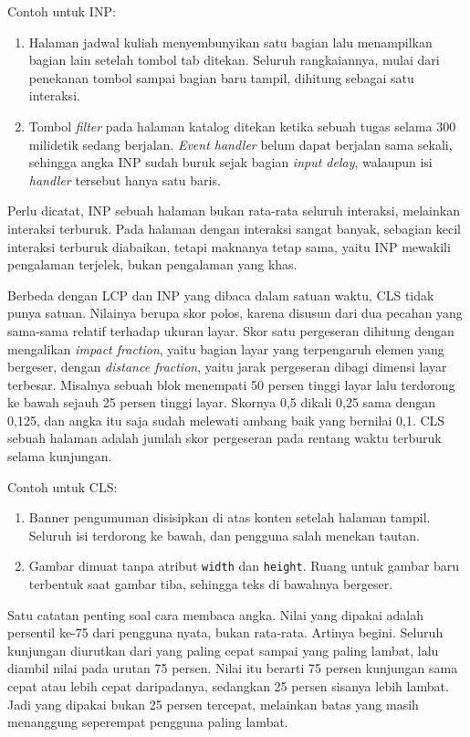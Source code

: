 Contoh untuk INP:

\begin{enumerate}
  \item Halaman jadwal kuliah menyembunyikan satu bagian lalu menampilkan
        bagian lain setelah tombol tab ditekan. Seluruh rangkaiannya, mulai
        dari penekanan tombol sampai bagian baru tampil, dihitung sebagai satu
        interaksi.
  \item Tombol \emph{filter} pada halaman katalog ditekan ketika sebuah tugas
        selama 300 milidetik sedang berjalan. \textit{Event handler} belum
        dapat berjalan sama sekali, sehingga angka INP sudah buruk sejak
        bagian \textit{input delay}, walaupun isi \textit{handler} tersebut
        hanya satu baris.
\end{enumerate}

Perlu dicatat, INP sebuah halaman bukan rata-rata seluruh interaksi, melainkan
interaksi terburuk. Pada halaman dengan interaksi sangat banyak, sebagian kecil
interaksi terburuk diabaikan, tetapi maknanya tetap sama, yaitu INP mewakili
pengalaman terjelek, bukan pengalaman yang khas.

Berbeda dengan LCP dan INP yang dibaca dalam satuan waktu, CLS tidak punya
satuan. Nilainya berupa skor polos, karena disusun dari dua pecahan yang
sama-sama relatif terhadap ukuran layar. Skor satu pergeseran dihitung dengan
mengalikan \textit{impact fraction}, yaitu bagian layar yang terpengaruh elemen
yang bergeser, dengan \textit{distance fraction}, yaitu jarak pergeseran dibagi
dimensi layar terbesar. Misalnya sebuah blok menempati 50 persen tinggi layar
lalu terdorong ke bawah sejauh 25 persen tinggi layar. Skornya 0,5 dikali 0,25
sama dengan 0,125, dan angka itu saja sudah melewati ambang baik yang bernilai
0,1. CLS sebuah halaman adalah jumlah skor pergeseran pada rentang waktu
terburuk selama kunjungan.

Contoh untuk CLS:

\begin{enumerate}
  \item Banner pengumuman disisipkan di atas konten setelah halaman tampil.
        Seluruh isi terdorong ke bawah, dan pengguna salah menekan tautan.
  \item Gambar dimuat tanpa atribut \texttt{width} dan \texttt{height}. Ruang
        untuk gambar baru terbentuk saat gambar tiba, sehingga teks di
        bawahnya bergeser.
\end{enumerate}

Satu catatan penting soal cara membaca angka. Nilai yang dipakai adalah
persentil ke-75 dari pengguna nyata, bukan rata-rata. Artinya begini. Seluruh
kunjungan diurutkan dari yang paling cepat sampai yang paling lambat, lalu
diambil nilai pada urutan 75 persen. Nilai itu berarti 75 persen kunjungan
sama cepat atau lebih cepat daripadanya, sedangkan 25 persen sisanya lebih
lambat. Jadi yang dipakai bukan 25 persen tercepat, melainkan batas yang masih
menanggung seperempat pengguna paling lambat.

